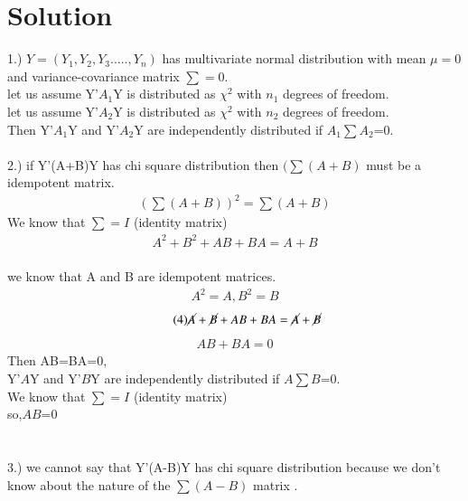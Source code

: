 \documentclass[journal,12pt,twocolumn]{IEEEtran}
\begin{document}
\section*{Solution}
1.) $Y=(Y_1,Y_2,Y_3.....,Y_n)$ has multivariate normal distribution with mean $\mu=0$ and variance-covariance matrix $\sum=0$.\\
let us assume Y'$A_1$Y  is distributed as $\chi^2$ with $n_1$ degrees of freedom.\\
let us assume Y'$A_2$Y  is distributed as $\chi^2$ with $n_2$ degrees of freedom.\\
Then Y'$A_1$Y and  Y'$A_2$Y  are independently distributed if $A_1\sum A_2$=0.\\
\\2.) if Y'(A+B)Y has chi square distribution then $(\sum(A+B)$ must be a idempotent matrix.\\
  \begin{align}
 \tag{1}
 (\textstyle \sum(A+B))^2=\sum(A+B) \label{eq:1} 
  \end{align}
   We know that $\sum=I$ (identity matrix)
    \begin{align}
 \tag{2}
  A^2+B^2+AB+BA=A+B \label{eq:1} 
  \end{align}
  \\we know that A and B are idempotent matrices.
    \begin{align}
 \tag{3}
 A^2=A ,B^2=B \label{eq:1} 
  \end{align}
   \begin{align}
 \tag{4}
 \cancel{A}+\cancel{B}+AB+BA=\cancel{A}+\cancel{B}\label{eq:1} 
  \end{align}
  \begin{align}
 \tag{5}
 AB+BA=0 \label{eq:1} 
  \end{align}
 Then AB=BA=0,
 \\Y'$A$Y and  Y'$B$Y  are independently distributed if $A\sum B$=0.\\
   We know that $\sum=I$ (identity matrix)\\so,$AB$=0\\
   \\
 \\3.) we cannot say that Y'(A-B)Y has chi square distribution because we don't know about the nature of the $\sum(A-B)$ matrix .\\
  
\end{document}
